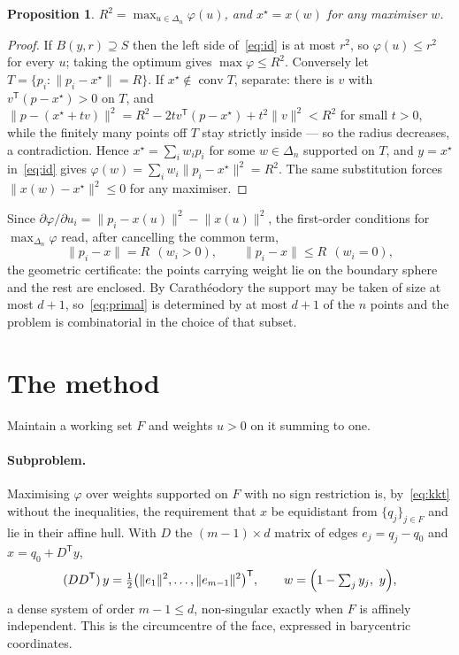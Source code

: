 \documentclass[10pt,a4paper]{article}
\theoremstyle{plain}
\newtheorem{proposition}{Proposition}
\theoremstyle{remark}
\DeclareMathOperator{\conv}{conv}
\newcommand{\norm}[1]{\lVert #1 \rVert}
\newcommand{\T}{^{\mathsf{T}}}
\begin{document}
\begin{proposition}
  \label{prop:duality}
  $R^2=\max_{u\in\Delta_n}\varphi(u)$, and $x^\star=x(w)$ for any maximiser $w$.
\end{proposition}

\begin{proof}
  If $B(y,r)\supseteq S$ then the left side of~\eqref{eq:id} is at most $r^2$, so
  $\varphi(u)\le r^2$ for every $u$; taking the optimum gives
  $\max\varphi\le R^2$. Conversely let $T=\{p_i:\norm{p_i-x^\star}=R\}$. If
  $x^\star\notin\conv T$, separate: there is $v$ with $v\T(p-x^\star)>0$ on $T$,
  and $\norm{p-(x^\star+tv)}^2=R^2-2tv\T(p-x^\star)+t^2\norm{v}^2<R^2$ for small
  $t>0$, while the finitely many points off $T$ stay strictly inside --- so the
  radius decreases, a contradiction. Hence $x^\star=\sum_i w_ip_i$ for some
  $w\in\Delta_n$ supported on $T$, and $y=x^\star$ in~\eqref{eq:id} gives
  $\varphi(w)=\sum_iw_i\norm{p_i-x^\star}^2=R^2$. The same substitution forces
  $\norm{x(w)-x^\star}^2\le0$ for any maximiser.
\end{proof}

Since $\partial\varphi/\partial u_i=\norm{p_i-x(u)}^2-\norm{x(u)}^2$, the
first-order conditions for $\max_{\Delta_n}\varphi$ read, after cancelling the
common term,
\begin{equation}
  \label{eq:kkt}
  \norm{p_i-x}=R\ \ (w_i>0),\qquad \norm{p_i-x}\le R\ \ (w_i=0),
\end{equation}
the geometric certificate: the points carrying weight lie on the boundary sphere
and the rest are enclosed. By Carath\'eodory the support may be taken of size at
most $d+1$, so~\eqref{eq:primal} is determined by at most $d+1$ of the $n$ points
and the problem is combinatorial in the choice of that subset.

\section{The method}

Maintain a working set $F$ and weights $u>0$ on it summing to one.

\paragraph{Subproblem.} Maximising $\varphi$ over weights supported on $F$ with no
sign restriction is, by~\eqref{eq:kkt} without the inequalities, the requirement
that $x$ be equidistant from $\{q_j\}_{j\in F}$ and lie in their affine hull.
With $D$ the $(m-1)\times d$ matrix of edges $e_j=q_j-q_0$ and $x=q_0+D\T y$,
\begin{equation}
  \label{eq:sub}
  (DD\T)\,y=\tfrac12\bigl(\norm{e_1}^2,\dots,\norm{e_{m-1}}^2\bigr)\T,
  \qquad w=\Bigl(1-\textstyle\sum_j y_j,\ y\Bigr),
\end{equation}
a dense system of order $m-1\le d$, non-singular exactly when $F$ is affinely
independent. This is the circumcentre of the face, expressed in barycentric
coordinates.
\end{document}
